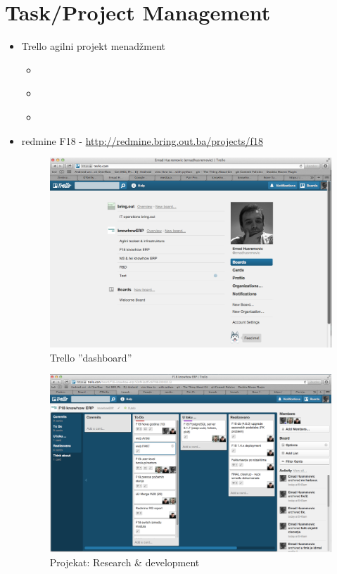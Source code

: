 \documentclass[times, utf8, seminar]{fit}
\begin{document}
\chapter{Task/Project Management}

\begin{itemize}
  \item Trello agilni projekt menadžment
    \begin{itemize}
      \item \href{https://trello.com/board/f18-knowhow-erp/50af43adf5c6f78820000223}{\color{blue}{F18 trello}}
      \item \href{https://trello.com/board/agilni-toolset-infrastruktura/50af48a4c8ddb2bf32012f47}{\color{blue}{Agilni toolset}}
      \item \href{https://trello.com/board/r-d/50af8dd450a1b0e36a0056fb}{\color{blue}{Research \& development (R\&D)}}
    \end{itemize}
  \item redmine F18 - \url{http://redmine.bring.out.ba/projects/f18} 

    
\begin{figure}[H]
\centering
\includegraphics[width=14cm]{img/trello_dashboard.png}
\caption{Trello ''dashboard''}
\end{figure}


\begin{figure}[H]
\centering
\includegraphics[width=14cm]{img/trello_f18.png}
\caption{Projekat: Research \& development}
\end{figure}


\end{itemize}
\end{document}
